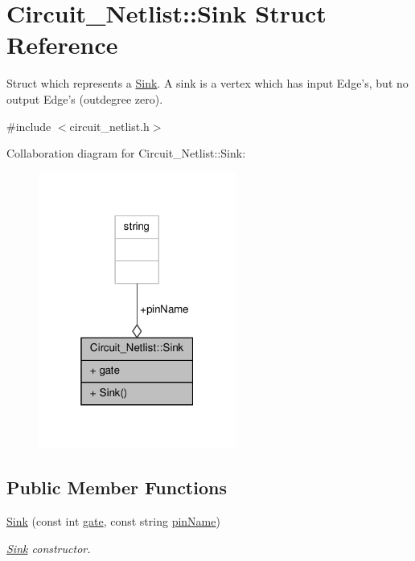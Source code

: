 \hypertarget{structCircuit__Netlist_1_1Sink}{\section{Circuit\-\_\-\-Netlist\-:\-:Sink Struct Reference}
\label{structCircuit__Netlist_1_1Sink}
}


Struct which represents a \hyperlink{structCircuit__Netlist_1_1Sink}{Sink}. A sink is a vertex which has input Edge's, but no output Edge's (outdegree zero).  




{\ttfamily \#include $<$circuit\-\_\-netlist.\-h$>$}



Collaboration diagram for Circuit\-\_\-\-Netlist\-:\-:Sink\-:\nopagebreak
\begin{figure}[H]
\begin{center}
\leavevmode
\includegraphics[width=184pt]{structCircuit__Netlist_1_1Sink__coll__graph}
\end{center}
\end{figure}
\subsection*{Public Member Functions}
\begin{DoxyCompactItemize}
\item 
\hyperlink{structCircuit__Netlist_1_1Sink_ad56d7d6a65455ec3e328d4bb8876936f}{Sink} (const int \hyperlink{structCircuit__Netlist_1_1Sink_a5728898bf1ef8a37b46f0f6274676889}{gate}, const string \hyperlink{structCircuit__Netlist_1_1Sink_ac2072a83f3d654b10f6ad0b2049cc2e6}{pin\-Name})
\begin{DoxyCompactList}\small\item\em \hyperlink{structCircuit__Netlist_1_1Sink}{Sink} constructor. \end{DoxyCompactList}\end{DoxyCompactItemize}
